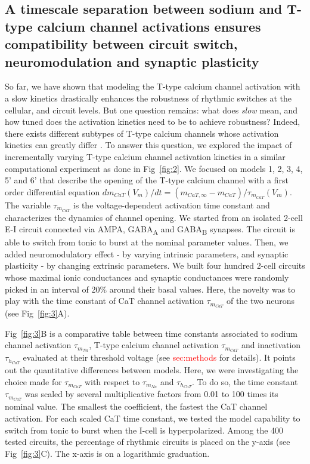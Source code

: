 \subsection{A timescale separation between sodium and T-type calcium channel activations ensures compatibility between circuit switch, neuromodulation and synaptic plasticity}
So far, we have shown that modeling the T-type calcium channel activation with a slow kinetics drastically enhances the robustness of rhythmic switches at the cellular, and circuit levels. But one question remains: what does \textit{slow} mean, and how tuned does the activation kinetics need to be to achieve robustness? Indeed, there exists different subtypes of T-type calcium channels whose activation kinetics can greatly differ \citep{hille_ion_2001, perez-reyes_molecular_2003}.
To answer this question, we explored the  impact of incrementally varying T-type calcium channel activation kinetics in a similar computational experiment as done in Fig~\ref{fig:2}. We focused on models 1, 2, 3, 4, 5' and 6' that describe the opening of the T-type calcium channel with a first order differential equation $  dm_{CaT}(V_m) /  dt = ( m_{CaT, \infty} - m_{CaT})/ \tau_{m_{CaT}}(V_m) $. The variable $\tau_{m_{CaT}}$ is the voltage-dependent activation time constant and characterizes the dynamics of channel opening. We started from an isolated 2-cell E-I circuit connected via AMPA, GABA\textsubscript{A} and GABA\textsubscript{B} synapses.  The circuit is able to switch from tonic to burst at the nominal parameter values. Then, we added neuromodulatory effect - by varying intrinsic parameters, and synaptic plasticity - by changing extrinsic parameters. We built four hundred 2-cell circuits whose maximal ionic conductances and synaptic conductances were randomly picked in an interval of 20$\%$ around their basal values. Here, the novelty was to play with the time constant of CaT channel activation $\tau_{m_{CaT}}$  of the two neurons (see Fig~\ref{fig:3}A). 

Fig~\ref{fig:3}B is a comparative table between time constants associated to sodium channel activation $\tau_{m_{Na}}$, T-type calcium channel activation $\tau_{m_{CaT}}$ and inactivation $\tau_{h_{CaT}}$ evaluated at their threshold voltage (see \textcolor{red}{sec:methods} for details). It points out the quantitative differences between models. Here, we were investigating the choice made for $\tau_{m_{CaT}}$ with respect to $\tau_{m_{Na}}$ and $\tau_{h_{CaT}}$. To do so, the time constant $\tau_{m_{CaT}}$ was scaled by several multiplicative factors from  0.01  to 100 times its nominal value. The smallest the coefficient, the fastest the CaT channel activation. For each scaled CaT time constant, we tested the model capability to switch from tonic to burst when the I-cell is hyperpolarized. Among the 400 tested circuits, the percentage of rhythmic circuits is placed on the y-axis (see Fig~\ref{fig:3}C). The x-axis is on a logarithmic graduation. 


